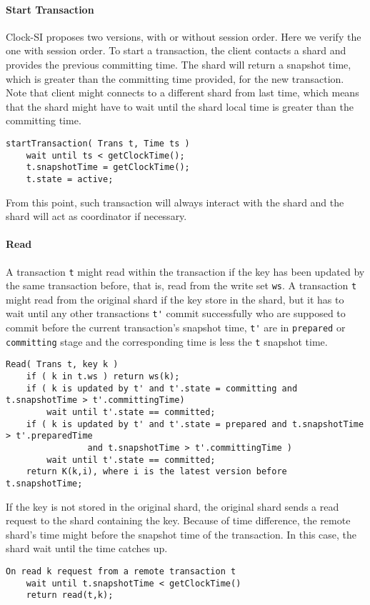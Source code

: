 \paragraph{\bf Start Transaction}
Clock-SI proposes two versions, with or without session order.
Here we verify the one with session order.
To start a transaction, the client contacts a shard 
and provides the previous committing time.
The shard will return a snapshot time, 
which is greater than the committing time provided, for the new transaction.
Note that client might connects to a different shard from last time,
which means that 
the shard might have to wait until the shard local time is greater than the committing time.
\begin{lstlisting}[caption={Transaction runtime},label={lst:clock-si-trans-runtime}]
startTransaction( Trans t, Time ts )
    wait until ts < getClockTime();
    t.snapshotTime = getClockTime();
    t.state = active;
\end{lstlisting}
From this point, such transaction will always interact with the shard and
the shard will act as coordinator if necessary.

\paragraph{\bf Read}
A transaction \verb|t| might read within the transaction if the key has been updated by the same transaction before,
that is, read from the write set \verb|ws|.
A transaction \verb|t| might read from the original shard if the key store in the shard,
but it has to wait until any other transactions \verb|t'| commit successfully
who are supposed to commit before the current transaction's snapshot time,
\ie \verb|t'| are in \verb|prepared| or \verb|committing| stage 
and the corresponding time is less the \verb|t| snapshot time.
\begin{lstlisting}[caption={Read from original shard},label={lst:clock-si-read-original}]
Read( Trans t, key k )
    if ( k in t.ws ) return ws(k);
    if ( k is updated by t' and t'.state = committing and t.snapshotTime > t'.committingTime)
        wait until t'.state == committed;
    if ( k is updated by t' and t'.state = prepared and t.snapshotTime > t'.preparedTime 
                and t.snapshotTime > t'.committingTime )
        wait until t'.state == committed;
    return K(k,i), where i is the latest version before t.snapshotTime;
\end{lstlisting}
If the key is not stored in the original shard, 
the original shard sends a read request to the shard containing the key.
Because of time difference, the remote shard's time might before the snapshot time of the transaction.
In this case, the shard wait until the time catches up.
\begin{lstlisting}[caption={Read from original shard},label={lst:clock-si-read-remote}]
On read k request from a remote transaction t
    wait until t.snapshotTime < getClockTime() 
    return read(t,k);
\end{lstlisting}

